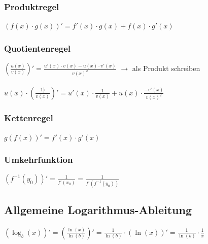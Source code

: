 			
			\subsubsection{Produktregel}
			$(f(x) \cdot g(x))' = f'(x) \cdot g(x) + f(x) \cdot g'(x)$ 
			
			\subsubsection{Quotientenregel}
			$\left( \frac{u(x)}{v(x)} \right) ' = \frac{u'(x) \cdot v(x) - u(x) \cdot v'(x)}{v(x) ^2}$ \quad $\rightarrow$ als Produkt schreiben \\
			\\
			$u(x) \cdot \left( \frac{1)}{v(x)} \right) ' =  u'(x) \cdot \frac{1}{v(x)} + u(x) \cdot \frac{- v'(x)}{v(x)^2}$
			
			\subsubsection{Kettenregel}
			$g(f(x))' =  f'(x) \cdot g'(x)$ \\
			
			\subsubsection{Umkehrfunktion}
			$(f^{-1}(y_0))' = \frac{1}{f'(x_0)} =  \frac{1}{f'(f^{-1}(y_0))}$ \\
			

			
			\subsection{Allgemeine Logarithmus-Ableitung}
			$(\log_b(x))' = \left( \frac{\ln(x)}{\ln(b)} \right)' = \frac{1}{\ln(b)} \cdot (\ln(x))' = \frac{1}{\ln(b)} \cdot \frac{1}{x} $
			
			
